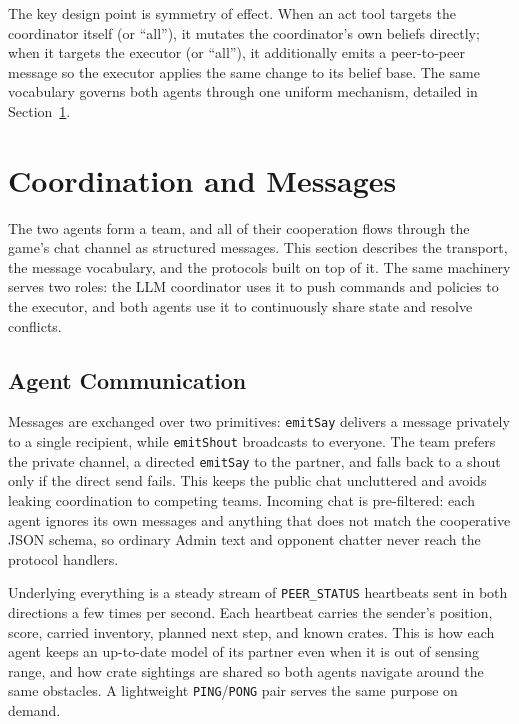 \documentclass[a4paper,11pt]{article}
\begin{document}
The key design point is symmetry of effect. When an act tool targets the coordinator
itself (or ``all''), it mutates the coordinator's own beliefs directly; when it
targets the executor (or ``all''), it additionally emits a peer-to-peer message so
the executor applies the same change to its belief base. The same vocabulary governs
both agents through one uniform mechanism, detailed in Section~\ref{sec:coordination}.


\section{Coordination and Messages}
\label{sec:coordination}

The two agents form a team, and all of their cooperation flows through the game's
chat channel as structured messages. This section describes the transport, the
message vocabulary, and the protocols built on top of it. The same machinery serves
two roles: the LLM coordinator uses it to push commands and policies to the executor,
and both agents use it to continuously share state and resolve conflicts.

\subsection{Agent Communication}

Messages are exchanged over two primitives: \texttt{emitSay} delivers a message
privately to a single recipient, while \texttt{emitShout} broadcasts to everyone. The
team prefers the private channel, a directed \texttt{emitSay} to the partner, and
falls back to a shout only if the direct send fails. This keeps the public chat
uncluttered and avoids leaking coordination to competing teams. Incoming chat is
pre-filtered: each agent ignores its own messages and anything that does not match
the cooperative JSON schema, so ordinary Admin text and opponent chatter never reach
the protocol handlers.

Underlying everything is a steady stream of \texttt{PEER\_STATUS} heartbeats sent in
both directions a few times per second. Each heartbeat carries the sender's position,
score, carried inventory, planned next step, and known crates. This is how each agent
keeps an up-to-date model of its partner even when it is out of sensing range, and
how crate sightings are shared so both agents navigate around the same obstacles. A
lightweight \texttt{PING}/\texttt{PONG} pair serves the same purpose on demand.
\end{document}

